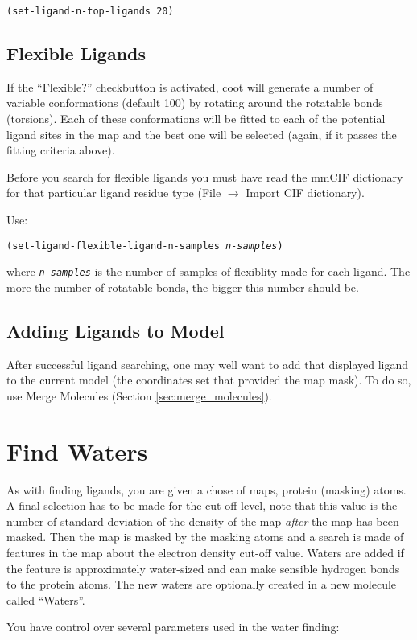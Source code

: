 \documentclass{book}
\begin{document}
\texttt{(set-ligand-n-top-ligands 20)}

\subsection{Flexible Ligands}
If the ``Flexible?'' checkbutton is activated, coot will generate a
number of variable conformations (default 100) by rotating around the
rotatable bonds (torsions).  Each of these conformations will be fitted
to each of the potential ligand sites in the map and the best one will
be selected (again, if it passes the fitting criteria above).

Before you search for flexible ligands you must have read the mmCIF
dictionary for that particular ligand residue type (\textsf{File
  $\rightarrow$ Import CIF dictionary}).

Use:

\texttt{(set-ligand-flexible-ligand-n-samples \emph{n-samples})}

where \texttt{\emph{n-samples}} is the number of samples of flexiblity
made for each ligand.  The more the number of rotatable bonds, the
bigger this number should be.

\subsection{Adding Ligands to Model}
After successful ligand searching, one may well want to add that
displayed ligand to the current model (the coordinates set that
provided the map mask).  To do so, use Merge Molecules (Section
\ref{sec:merge_molecules}).


\section{Find Waters}
 As with finding ligands, you are given a chose
of maps, protein (masking) atoms. A final selection has to be made for
the cut-off level, note that this value is the number of standard
deviation of the density of the map \emph{after} the map has been
masked.  Then the map is masked by the masking atoms and a search is
made of features in the map about the electron density cut-off value.
Waters are added if the feature is approximately water-sized and can
make sensible hydrogen bonds to the protein atoms.  The new waters are
optionally created in a new molecule called ``Waters''.

You have control over several parameters used in the water finding:
\end{document}

